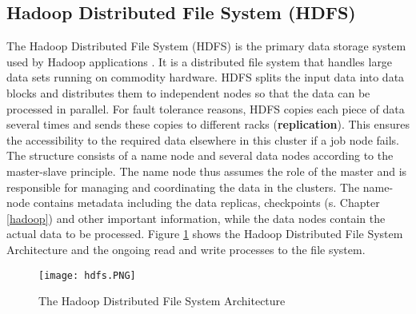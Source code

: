 \subsection{Hadoop Distributed File System (HDFS)}
The Hadoop Distributed File System (HDFS) is the primary data storage system used by Hadoop applications \cite[see][]{MR01}. It is a distributed file system that handles large data sets running on commodity hardware. HDFS splits the input data into data blocks and distributes them to independent nodes so that the data can be processed in parallel. For fault tolerance reasons, HDFS copies each piece of data several times and sends these copies to different racks (\textbf{replication}). This ensures the accessibility to the required data elsewhere in this cluster if a job node fails.\\
The structure consists of a name node and several data nodes according to the master-slave principle. The name node thus assumes the role of the master and is responsible for managing and coordinating the data in the clusters. The name-node contains metadata including the data replicas, checkpoints (s. Chapter \ref{hadoop}) and other important information, while the data nodes contain the actual data to be processed. Figure \ref{hdfs} shows the Hadoop Distributed File System Architecture and the ongoing read and write processes to the file system. 
\begin{figure}[H]
	\centering
	\texttt{[image: hdfs.PNG]}
	\caption[Caption for LOF]{The Hadoop Distributed File System Architecture\footnotemark}
	\label{hdfs}
\end{figure}

